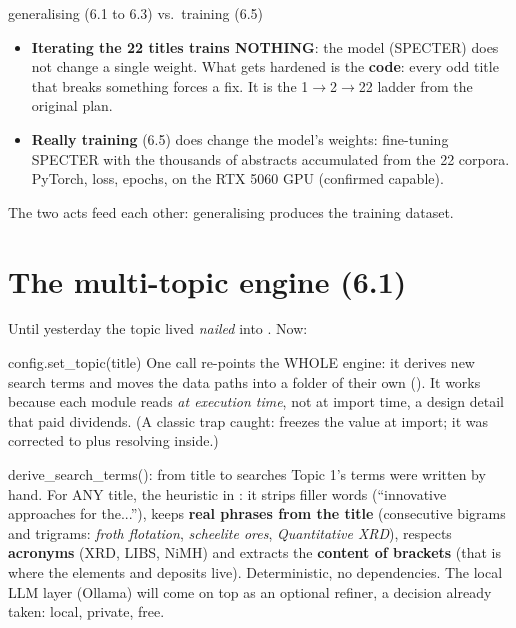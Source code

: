 \documentclass[11pt,a4paper]{article}
\begin{document}
\begin{concepto}{generalising (6.1 to 6.3) vs.\ training (6.5)}
\begin{itemize}
  \item \textbf{Iterating the 22 titles trains NOTHING}: the model (SPECTER) does not change a
        single weight. What gets hardened is the \textbf{code}: every odd title that breaks
        something forces a fix. It is the 1$\rightarrow$2$\rightarrow$22 ladder from the
        original plan.
  \item \textbf{Really training} (6.5) does change the model's weights: fine-tuning SPECTER
        with the thousands of abstracts accumulated from the 22 corpora. PyTorch, loss, epochs,
        on the RTX 5060 GPU (confirmed capable).
\end{itemize}
The two acts feed each other: generalising produces the training dataset.
\end{concepto}

\section{The multi-topic engine (6.1)}

Until yesterday the topic lived \emph{nailed} into . Now:

\begin{concepto}{config.set\_topic(title)}
One call re-points the WHOLE engine: it derives new search terms and moves the data paths into
a folder of their own (). It works because each module reads
 \emph{at execution time}, not at import time, a design detail that paid
dividends. (A classic trap caught:  freezes the value at import;
it was corrected to  plus resolving inside.)
\end{concepto}

\begin{concepto}{derive\_search\_terms(): from title to searches}
Topic 1's terms were written by hand. For ANY title, the heuristic in :
it strips filler words (``innovative approaches for the...''), keeps \textbf{real phrases from
the title} (consecutive bigrams and trigrams: \emph{froth flotation}, \emph{scheelite ores},
\emph{Quantitative XRD}), respects \textbf{acronyms} (XRD, LIBS, NiMH) and extracts the
\textbf{content of brackets} (that is where the elements and deposits live). Deterministic, no
dependencies. The local LLM layer (Ollama) will come on top as an optional refiner, a decision
already taken: local, private, free.
\end{concepto}
\end{document}
